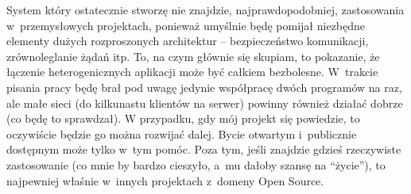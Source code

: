 System który ostatecznie stworzę nie znajdzie, najprawdopodobniej, zastosowania w~przemysłowych projektach, ponieważ umyślnie będę pomijał niezbędne elementy dużych rozproszonych architektur -- bezpieczeństwo komunikacji, zrównoleglanie żądań itp. To, na czym głównie się skupiam, to pokazanie, że łączenie heterogenicznych aplikacji może być całkiem bezbolesne. W~trakcie pisania pracy będę brał pod uwagę jedynie współpracę dwóch programów na raz, ale małe sieci (do kilkunastu klientów na serwer) powinny również działać dobrze (co będę to sprawdzał). W przypadku, gdy mój projekt się powiedzie, to oczywiście będzie go można rozwijać dalej. Bycie otwartym i~publicznie dostępnym może tylko w~tym pomóc. Poza tym, jeśli znajdzie gdzieś rzeczywiste zastosowanie (co mnie by bardzo cieszyło, a~mu dałoby szansę na ``życie''), to najpewniej właśnie w~innych projektach z~domeny Open Source.



